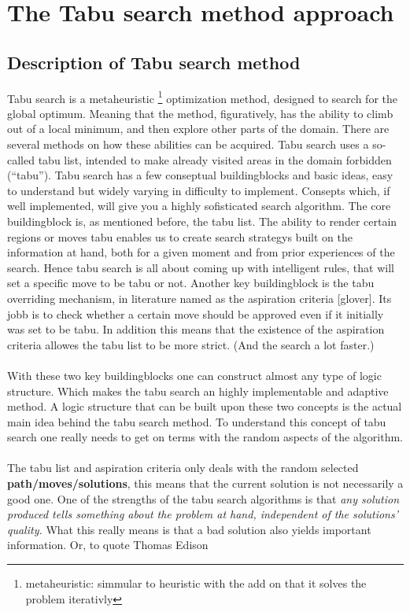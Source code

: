 \section{The Tabu search method approach}
\subsection{Description of Tabu search method}
Tabu search is a metaheuristic \footnote{ metaheuristic: simmular to heuristic with the add on that it solves the problem iterativly} optimization method, designed to search for the global optimum. Meaning that the method, figuratively, has the ability to climb out of a local minimum, and then explore other parts of the domain. There are several methods on how these abilities can be acquired. Tabu search uses a so-called tabu list, intended to make already visited areas in the domain forbidden (``tabu''). Tabu search has a few conseptual buildingblocks and basic ideas, easy to understand but widely varying in difficulty to implement. Consepts which, if well implemented, will give you a highly sofisticated search algorithm. The core buildingblock is, as mentioned before, the tabu list. The ability to render certain regions or moves tabu enables us to create search strategys built on the information at hand, both for a given moment and from prior experiences of the search. Hence tabu search is all about coming up with intelligent rules, that will set a specific move to be tabu or not. Another key buildingblock is the tabu overriding mechanism, in literature named as the aspiration criteria [glover]. Its jobb is to check whether a certain move should be approved even if it initially was set to be tabu. In addition this means that the existence of the aspiration criteria allowes the tabu list to be more strict. (And the search a lot faster.)\\
\\
With these two key buildingblocks one can construct almost any type of logic structure. Which makes the tabu search an highly implementable and adaptive method. A logic structure that can be built upon these two concepts is the actual main idea behind the tabu search method. To understand this concept of tabu search one really needs to get on terms with the random aspects of the algorithm.\\

\\The tabu list and aspiration criteria only deals with the random selected \textbf{path/moves/solutions}, this means that the current solution is not necessarily a good one. One of the strengths of the tabu search algorithms is that \emph{any solution produced tells something about the problem at hand, independent of the solutions' quality.} What this really means is that a bad solution also yields important information.  Or, to quote Thomas Edison 


